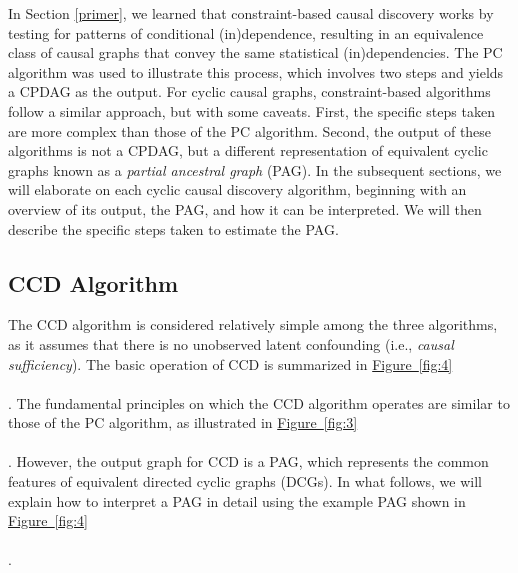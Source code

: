 \documentclass[twoside, 11pt]{article}
\newcommand*{\figref}[2][]{%
  \hyperref[{fig:#2}]{%
    Figure~\ref*{fig:#2}%
    \ifx\\#1\\%
    \else
      #1%
    \fi
  }%
}
\begin{document}
In Section \ref{primer}, we learned that constraint-based causal discovery works by testing for patterns of conditional (in)dependence, resulting in an equivalence class of causal graphs that convey the same statistical (in)dependencies. The PC algorithm was used to illustrate this process, which involves two steps and yields a CPDAG as the output. For cyclic causal graphs, constraint-based algorithms follow a similar approach, but with some caveats. First, the specific steps taken are more complex than those of the PC algorithm. Second, the output of these algorithms is not a CPDAG, but a different representation of equivalent cyclic graphs known as a \textit{partial ancestral graph} (PAG). In the subsequent sections, we will elaborate on each cyclic causal discovery algorithm, beginning with an overview of its output, the PAG, and how it can be interpreted. We will then describe the specific steps taken to estimate the PAG.




\subsection{CCD Algorithm}
The CCD algorithm is considered relatively simple among the three algorithms, as it assumes that there is no unobserved latent confounding (i.e., \textit{causal sufficiency}). The basic operation of CCD is summarized in \figref[]{4}. The fundamental principles on which the CCD algorithm operates are similar to those of the PC algorithm, as illustrated in \figref[]{3}. However, the output graph for CCD is a PAG, which represents the common features of equivalent directed cyclic graphs (DCGs).
In what follows, we will explain how to interpret a PAG in detail using the example PAG shown in \figref[]{4}.
\end{document}
